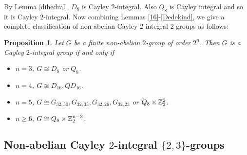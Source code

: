 \documentclass{amsart}
\newtheorem{pro}[thm]{Proposition}
\def \geq {\geqslant}
\begin{document}
By Lemma \ref{dihedral}, $D_8$ is Cayley $2$-integral. Also $Q_8$ is Cayley integral and so it is Cayley $2$-integral. Now combining Lemmas \ref{16}-\ref{Dedekind}, we give a complete classification of non-abelian Cayley $2$-integral $2$-groups as follows:
\begin{pro}\label{non-ab-2groups}
	Let $G$ be a finite non-abelian $2$-group of order $2^n$. Then $G$ is a Cayley $2$-integral group if and only if
	\begin{itemize}
		\item[(1)] $n=3$, $G\cong D_8$ or $Q_8$.
		\item[(2)] $n=4$, $G\ncong D_{16}, QD_{16}$.
		\item[(3)] $n=5$, $G\cong  G_{32,50}, G_{32,35}, G_{32,26}, G_{32,23}$ or $Q_8\times\Bbb Z_2^2$.
		\item[(4)] $n\geq 6$, $G\cong Q_8\times\Bbb Z_2^{n-3}$. 
	\end{itemize}
\end{pro}
 
 
\subsection{Non-abelian Cayley $2$-integral $\{2,3\}$-groups}





\end{document}
